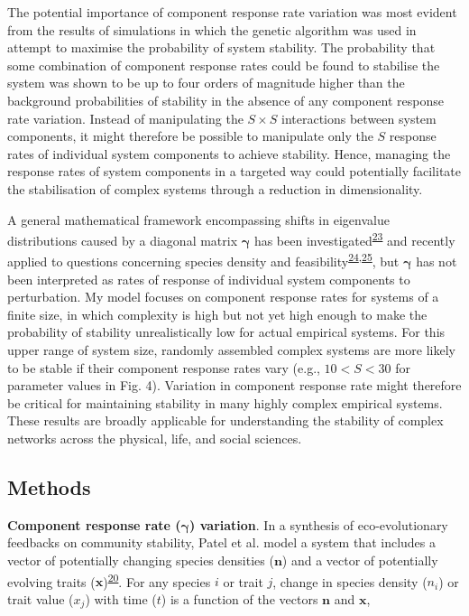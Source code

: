 \documentclass[]{article}
\begin{document}
The potential importance of component response rate variation was most
evident from the results of simulations in which the genetic algorithm
was used in attempt to maximise the probability of system stability. The
probability that some combination of component response rates could be
found to stabilise the system was shown to be up to four orders of
magnitude higher than the background probabilities of stability in the
absence of any component response rate variation. Instead of
manipulating the \(S \times S\) interactions between system components,
it might therefore be possible to manipulate only the \(S\) response
rates of individual system components to achieve stability. Hence,
managing the response rates of system components in a targeted way could
potentially facilitate the stabilisation of complex systems through a
reduction in dimensionality.

A general mathematical framework encompassing shifts in eigenvalue
distributions caused by a diagonal matrix \(\boldsymbol{\gamma}\) has
been
investigated\textsuperscript{\protect\hyperlink{ref-Ahmadian2015}{23}}
and recently applied to questions concerning species density and
feasibility\textsuperscript{\protect\hyperlink{ref-Gibbs2017}{24},\protect\hyperlink{ref-Stone2017}{25}},
but \(\boldsymbol{\gamma}\) has not been interpreted as rates of
response of individual system components to perturbation. My model
focuses on component response rates for systems of a finite size, in
which complexity is high but not yet high enough to make the probability
of stability unrealistically low for actual empirical systems. For this
upper range of system size, randomly assembled complex systems are more
likely to be stable if their component response rates vary (e.g.,
\(10 < S < 30\) for parameter values in Fig. 4). Variation in component
response rate might therefore be critical for maintaining stability in
many highly complex empirical systems. These results are broadly
applicable for understanding the stability of complex networks across
the physical, life, and social sciences.

\subsection{Methods}\label{methods}

\textbf{Component response rate (\(\boldsymbol{\gamma}\)) variation}. In
a synthesis of eco-evolutionary feedbacks on community stability, Patel
et al. model a system that includes a vector of potentially changing
species densities (\(\mathbf{n}\)) and a vector of potentially evolving
traits
(\(\mathbf{x}\))\textsuperscript{\protect\hyperlink{ref-Patel2018}{20}}.
For any species \(i\) or trait \(j\), change in species density
(\(n_{i}\)) or trait value (\(x_{j}\)) with time (\(t\)) is a function
of the vectors \(\mathbf{n}\) and \(\mathbf{x}\),
\end{document}
